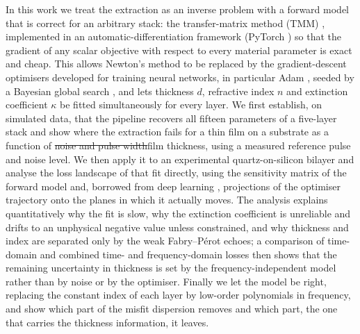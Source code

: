 \documentclass{optica-article}
\DeclareRobustCommand{\chg}[1]{{\color{blue}#1}}
\DeclareRobustCommand{\del}[1]{{\color{red}\sout{#1}}}
\newcommand{\kap}{\kappa}
\begin{document}
In this work we treat the extraction as an inverse problem \cite{Tarantola2005,Aster2018} with a forward model that is correct for an arbitrary stack: the transfer-matrix method (TMM) \cite{BornWolf1999,Yeh1988}, implemented in an automatic-differentiation framework (PyTorch \cite{Paszke2019,Baydin2018}) so that the gradient of any scalar objective with respect to every material parameter is exact and cheap. This allows Newton's method to be replaced by the gradient-descent optimisers developed for training neural networks, in particular Adam \cite{Kingma2017}, seeded by a Bayesian global search \cite{Mockus1978,Snoek2012,Shahriari2016,Greenall2017,Peretti2019}, and lets thickness $d$, refractive index $n$ and extinction coefficient $\kap$ be fitted simultaneously for every layer. We first establish, on simulated data, that the pipeline recovers all fifteen parameters of a five-layer stack and show where the extraction fails for a thin film on a substrate as a function of \del{noise and pulse width}\chg{film thickness, using a measured reference pulse and noise level}. We then apply it to an experimental quartz-on-silicon bilayer and analyse the loss landscape of that fit directly, using the sensitivity matrix of the forward model and, borrowed from deep learning \cite{Li2018}, projections of the optimiser trajectory onto the planes in which it actually moves. The analysis explains quantitatively why the fit is slow, why the extinction coefficient is unreliable and drifts to an unphysical negative value unless constrained, and why thickness and index are separated only by the weak Fabry--P\'erot echoes; a comparison of time-domain and combined time- and frequency-domain losses then shows that the remaining uncertainty in thickness is set by the frequency-independent model rather than by noise or by the optimiser. Finally we let the model be right, replacing the constant index of each layer by low-order polynomials in frequency, and show which part of the misfit dispersion removes and which part, the one that carries the thickness information, it leaves.

\end{document}
